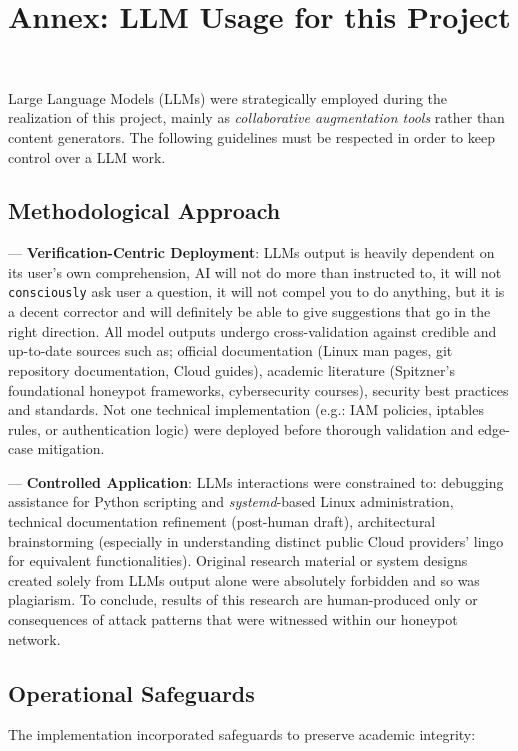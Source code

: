 \newpage

\newpage 


\section{Annex: LLM Usage for this Project}  
\label{annex:llm}  
\
\

Large Language Models (LLMs) were strategically employed during the realization of this project, mainly as \emph{collaborative augmentation tools} rather than content generators. The following guidelines must be respected in order to keep control over a LLM work.
\subsection*{Methodological Approach}

--- \textbf{Verification-Centric Deployment}: LLMs output is heavily dependent on its user's own comprehension, AI will not do more than instructed to, it will not \texttt{consciously} ask user a question, it will not compel you to do anything, but it is a decent corrector and will definitely be able to give suggestions that go in the right direction. All model outputs undergo cross-validation against credible and up-to-date sources such as; official documentation (Linux man pages, git repository documentation, Cloud guides), academic literature (Spitzner's foundational honeypot frameworks, cybersecurity courses), security best practices and standards. Not one technical implementation (e.g.: IAM policies, iptables rules, or authentication logic) were deployed before thorough validation and edge-case mitigation.

--- \textbf{Controlled Application}: LLMs interactions were constrained to: debugging assistance for Python scripting and \textit{systemd}-based Linux administration, technical documentation refinement (post-human draft), architectural brainstorming (especially in understanding distinct public Cloud providers' lingo for equivalent functionalities). Original research material or system designs created solely from LLMs output alone were absolutely forbidden and so was plagiarism. To conclude, results of this research are human-produced only or consequences of attack patterns that were witnessed within our honeypot network.

\subsection*{Operational Safeguards}
The implementation incorporated safeguards to preserve academic integrity:

